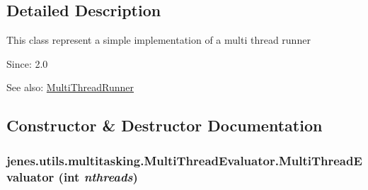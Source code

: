 \subsection{Detailed Description}
This class represent a simple implementation of a multi thread runner

\begin{Desc}
\item[Since:]2.0\end{Desc}
\begin{Desc}
\item[See also:]\hyperlink{classjenes_1_1utils_1_1multitasking_1_1_multi_thread_runner}{MultiThreadRunner} \end{Desc}


\subsection{Constructor \& Destructor Documentation}
\hypertarget{classjenes_1_1utils_1_1multitasking_1_1_multi_thread_evaluator_842d648ae03a8d7f835a24c522d229ae}{
\subsubsection[MultiThreadEvaluator]{\setlength{\rightskip}{0pt plus 5cm}jenes.utils.multitasking.MultiThreadEvaluator.MultiThreadEvaluator (int {\em nthreads})}}
\label{classjenes_1_1utils_1_1multitasking_1_1_multi_thread_evaluator_842d648ae03a8d7f835a24c522d229ae}


